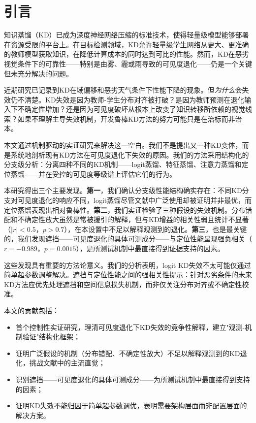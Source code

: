 \section{引言}
\label{sec:intro}

知识蒸馏（KD）已成为深度神经网络压缩的标准技术，使得轻量级模型能够部署在资源受限的平台上\cite{hinton2015distilling}。在目标检测领域，KD允许轻量级学生网络从更大、更准确的教师模型获取知识，在降低计算成本的同时达到可比的性能\cite{chen2017learning, dai2021general}。然而，KD在恶劣视觉条件下的可靠性——特别是由雾、霾或雨导致的可见度退化——仍是一个关键但未充分解决的问题。

近期研究已记录到KD在域偏移和恶劣天气条件下性能下降的现象\cite{guo2021meets, du2022learning}。但\emph{为什么}会失效仍不清楚。KD失效是因为教师-学生分布对齐被打破？是因为教师预测在退化输入下不确定性增加？还是因为可见度破坏从根本上改变了知识转移所依赖的视觉线索？如果不理解主导失效机制，开发鲁棒KD方法的努力可能只是在治标而非治本。

本文通过机制驱动的实证研究来解决这一空白。我们不是提出又一种KD变体，而是系统地剖析现有KD方法在可见度退化下失效的原因。我们的方法采用结构化的分支级分析：分离四种不同的KD机制——logit蒸馏、特征蒸馏、注意力蒸馏和定位蒸馏——并在受控的可见度等级谱上评估它们的行为。

本研究得出三个主要发现。\textbf{第一}，我们确认分支级性能结构确实存在：不同KD分支对可见度退化的响应不同，logit蒸馏尽管文献中广泛使用却被证明并非最优，而定位蒸馏表现出相对鲁棒性。\textbf{第二}，我们实证检验了三种假设的失效机制。分布错配和不确定性放大虽然是常被援引的解释，但与KD增益的相关性弱且统计不显著（$|r|<0.5$，$p>0.7$），在本设置中不足以解释观测到的退化。\textbf{第三}，也是最关键的，我们发现遮挡——可见度退化的具体可测成分——与定位性能呈现强负相关（$r=-0.989$，$p=0.0015$），是所测试机制中最直接得到证据支持的因素。

这些发现具有重要的方法论意义。我们的分析表明，logit KD失效不太可能仅通过简单超参数调整解决。遮挡与定位性能之间的强相关性提示：针对恶劣条件的未来KD方法应优先处理遮挡和空间信息损失机制，而非仅关注分布对齐或不确定性校准。

本文的贡献包括：
\begin{itemize}
    \item 首个控制性实证研究，理清可见度退化下KD失效的竞争性解释，建立"观测-机制验证"结构化框架；
    \item 证明广泛假设的机制（分布错配、不确定性放大）不足以解释观测到的KD退化，挑战文献中的主流直觉；
    \item 识别遮挡——可见度退化的具体可测成分——为所测试机制中最直接得到支持的因素；
    \item 证明KD失效不能归因于简单超参数调优，表明需要架构层面而非配置层面的解决方案。
\end{itemize}

